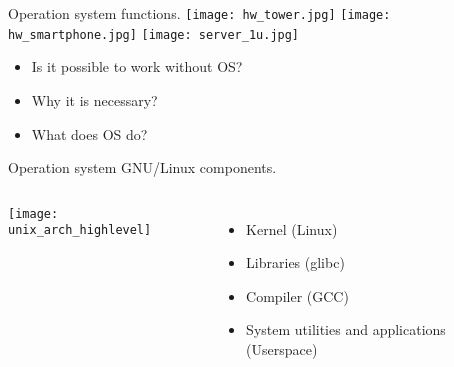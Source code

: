 \begin{frame}{Operation system functions.}
\texttt{[image: hw\_tower.jpg]} 
\texttt{[image: hw\_smartphone.jpg]}
\texttt{[image: server\_1u.jpg]}
	\begin{itemize}
            \item Is it possible to work without OS?
            \item Why it is necessary?
	    \item What does OS do?
	\end{itemize}
\end{frame}

\begin{frame}{Operation system GNU/Linux components.}
\pause
    \begin{columns}
    \texttt{[image: unix\_arch\_highlevel]}
	\begin{itemize}
		\item Kernel (Linux)
		\item Libraries (glibc)
                \item Compiler (GCC) 
		\item System utilities and applications (Userspace)
	\end{itemize}
    \end{columns}
\end{frame}
